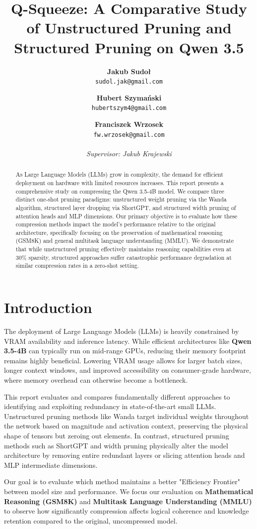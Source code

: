 \documentclass[11pt,a4paper,twocolumn]{article}
\title{\textbf{Q-Squeeze: A Comparative Study of Unstructured Pruning and Structured Pruning on Qwen 3.5}}
\author{
  \textbf{Jakub Sudoł} \\ \texttt{sudol.jak@gmail.com} \and
  \textbf{Hubert Szymański} \\ \texttt{hubertszym4@gmail.com} \and
  \textbf{Franciszek Wrzosek} \\ \texttt{fw.wrzosek@gmail.com} \\
  \\
  \textit{Supervisor: Jakub Krajewski}
}
\date{}
\begin{document}
\maketitle

\begin{abstract}
As Large Language Models (LLMs) grow in complexity, the demand for efficient deployment on hardware with limited resources increases. This report presents a comprehensive study on compressing the Qwen 3.5-4B model. We compare three distinct one-shot pruning paradigms: unstructured weight pruning via the Wanda algorithm, structured layer dropping via ShortGPT, and structured width pruning of attention heads and MLP dimensions. Our primary objective is to evaluate how these compression methods impact the model's performance relative to the original architecture, specifically focusing on the preservation of mathematical reasoning (GSM8K) and general multitask language understanding (MMLU). We demonstrate that while unstructured pruning effectively maintains reasoning capabilities even at 30\% sparsity, structured approaches suffer catastrophic performance degradation at similar compression rates in a zero-shot setting.
\end{abstract}

\section{Introduction}
The deployment of Large Language Models (LLMs) is heavily constrained by VRAM availability and inference latency. While efficient architectures like \textbf{Qwen 3.5-4B} can typically run on mid-range GPUs, reducing their memory footprint remains highly beneficial. Lowering VRAM usage allows for larger batch sizes, longer context windows, and improved accessibility on consumer-grade hardware, where memory overhead can otherwise become a bottleneck.

This report evaluates and compares fundamentally different approaches to identifying and exploiting redundancy in state-of-the-art small LLMs. Unstructured pruning methods like Wanda target individual weights throughout the network based on magnitude and activation context, preserving the physical shape of tensors but zeroing out elements. In contrast, structured pruning methods such as ShortGPT and width pruning physically alter the model architecture by removing entire redundant layers or slicing attention heads and MLP intermediate dimensions. 

Our goal is to evaluate which method maintains a better "Efficiency Frontier" between model size and performance. We focus our evaluation on \textbf{Mathematical Reasoning (GSM8K)} and \textbf{Multitask Language Understanding (MMLU)} to observe how significantly compression affects logical coherence and knowledge retention compared to the original, uncompressed model.
\end{document}
